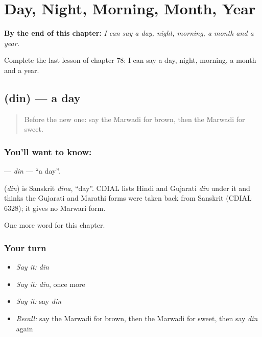 
\chapter{Day, Night, Morning, Month, Year}
\label{ch:mw-day-night-morning-month-year}

\begin{chapteropening}
\textbf{By the end of this chapter:} \emph{I can say a day, night, morning, a month and a year.}

Complete the last lesson of chapter 78: I can say a day, night, morning, a month and a year.
\end{chapteropening}

\section[\texorpdfstring{\mw{दिन} (din)}{दिन (din)}]{ (din) — a day}

\label{lesson:MW-C78-din}



\begin{quote}
Before the new one: say the Marwadi for brown, then the Marwadi for sweet.
\end{quote}

\subsection*{You'll want to know: }
\textbf{} — \emph{din} — \textquotedblleft{}a day\textquotedblright{}.

\begin{cousinweb}
\textbf{} (\emph{din}) is Sanskrit \emph{dina}, \textquotedblleft{}day\textquotedblright{}. CDIAL lists Hindi and Gujarati \emph{din} under it and thinks the Gujarati and Marathi forms were taken back from Sanskrit (CDIAL 6328); it gives no Marwari form.
\end{cousinweb}

\begin{grammarlens}[title={What you've built}]
One more word for this chapter.
\end{grammarlens}

\subsection*{Your turn}
\begin{itemize}
\raggedright
  \item \emph{Say it:} \emph{din}
  \item \emph{Say it:} \emph{din}, once more
  \item \emph{Say it:} say \emph{din}
  \item \emph{Recall:} say the Marwadi for brown, then the Marwadi for sweet, then say \emph{din} again
\end{itemize}

